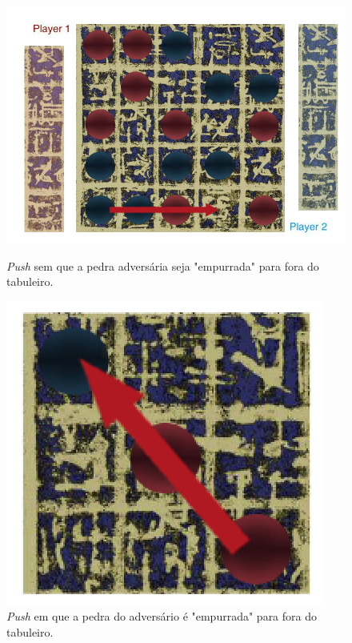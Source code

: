 \documentclass[a4paper]{article}
\begin{document}
\begin{figure}[!htb]
	\centering
  	\includegraphics[scale=0.2]{images/push_not_pool.png}
	\caption{\textit{Push} sem que a pedra adversária seja "empurrada" para fora do tabuleiro.}
\endminipage\hfill
{}
 \vspace*{2.3cm}
	\centering
	 \includegraphics[scale=0.2]{images/push_pool.png} \vspace*{0.3cm}
	\caption{\textit{Push} em que a pedra do adversário é "empurrada" para fora do tabuleiro.}
\endminipage
\end{figure}

\newpage
\end{document}
